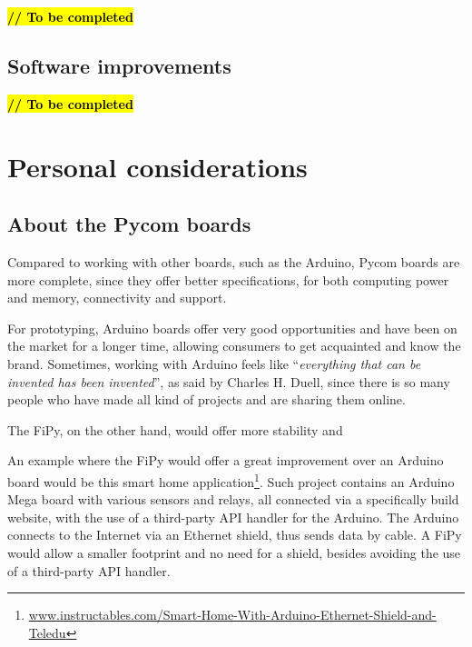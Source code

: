 			\textbf{\textcolor{red}{\hl{// To be completed}}}

		\subsection{Software improvements}
		
%			

			\textbf{\textcolor{red}{\hl{// To be completed}}}

	\section{Personal considerations}
	
		\subsection{About the Pycom boards}\label{sec:working_with_pycom}
		
			Compared to working with other boards, such as the Arduino, Pycom boards are more complete, since they offer better specifications, for both computing power and memory, connectivity and support.
			
			For prototyping, Arduino boards offer very good opportunities and have been on the market for a longer time, allowing consumers to get acquainted and know the brand.
			Sometimes, working with Arduino feels like ``\textit{everything that can be invented has been invented}'', as said by Charles H. Duell, since there is so many people who have made all kind of projects and are sharing them online.
			
			The FiPy, on the other hand, would offer more stability and 
			
			An example where the FiPy would offer a great improvement over an Arduino board would be this smart home application\footnote{ \url{www.instructables.com/Smart-Home-With-Arduino-Ethernet-Shield-and-Teledu}}.
			Such project contains an Arduino Mega board with various sensors and relays, all connected via a specifically build website, with the use of a third-party API handler for the Arduino.
			The Arduino connects to the Internet via an Ethernet shield, thus sends data by cable.
			A FiPy would allow a smaller footprint and no need for a shield, besides avoiding the use of a third-party API handler.
			
